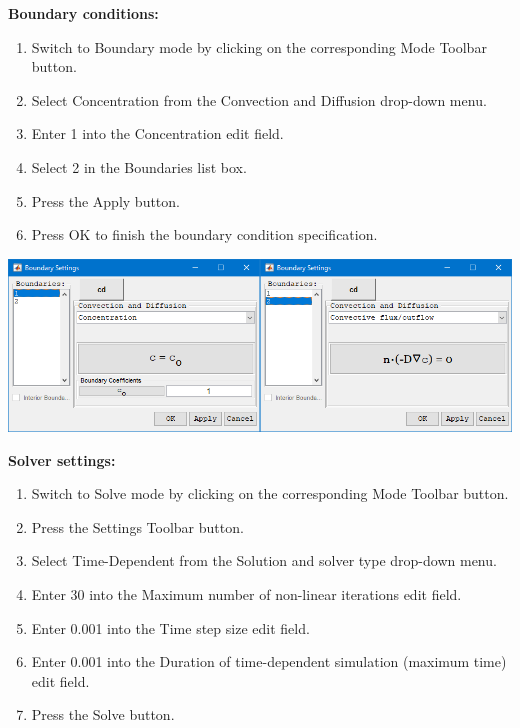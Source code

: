 \documentclass{article}
\begin{document}
\textbf{Boundary conditions:}
\begin{enumerate}[resume]
\item Switch to Boundary mode by clicking on the corresponding Mode Toolbar button.
\item Select Concentration from the Convection and Diffusion drop-down menu.
\item Enter  1  into the Concentration edit field.
\item Select 2 in the Boundaries list box.
\item Press the Apply button.
\item Press OK to finish the boundary condition specification.
\end{enumerate}

\begin{center}
\includegraphics[scale=0.60]{./matlab/FEATool_steps/boundaryConditions.png}
\end{center}

\textbf{Solver settings:}
\begin{enumerate}[resume]
\item Switch to Solve mode by clicking on the corresponding Mode Toolbar button.
\item Press the Settings Toolbar button.
\item Select Time-Dependent from the Solution and solver type drop-down menu.
\item Enter  30  into the Maximum number of non-linear iterations edit field.
\item Enter  0.001  into the Time step size edit field.
\item Enter  0.001  into the Duration of time-dependent simulation (maximum time) edit field.
\item Press the Solve button.
\end{enumerate}
\end{document}
